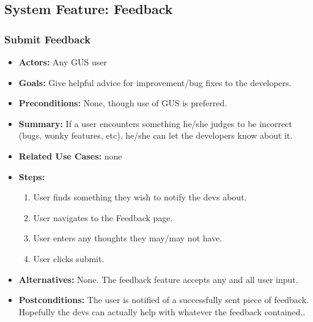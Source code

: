 \subsection{System Feature: Feedback}
	\subsubsection{Submit Feedback}
                        \begin{itemize}
                               \item{\textbf{Actors:} Any GUS user}
                                \item{\textbf{Goals:} Give helpful advice for improvement/bug fixes to the developers.}
                                \item{\textbf{Preconditions:} None, though use of GUS is preferred.}
                                \item{\textbf{Summary:} If a user encounters something he/she judges to be incorrect (bugs, wonky features, etc), he/she can let the developers know about it.} 
                                \item{\textbf{Related Use Cases:} none}
								\item{\textbf{Steps:}}
                                \begin{enumerate}
									\item User finds something they wish to notify the devs about.
									\item User navigates to the Feedback page.
									\item User enters any thoughts they may/may not have.
									\item User clicks submit.
                                \end{enumerate}
                                \item{\textbf{Alternatives:} None. The feedback feature accepts any and all user input.}
                                \item{\textbf{Postconditions:} The user is notified of a successfully sent piece of feedback. Hopefully the devs can actually help with whatever the feedback contained..}
                        \end{itemize}

